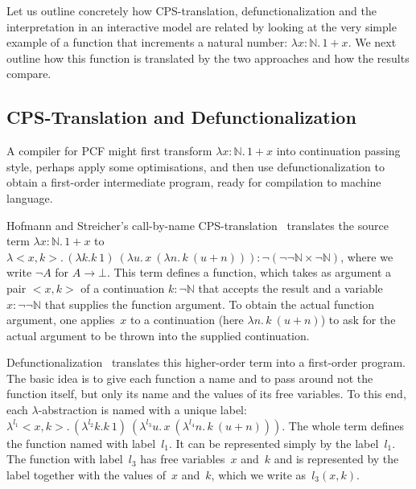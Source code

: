 \documentclass{LMCS}
\theoremstyle{definition}
\theoremstyle{plain}
\newcommand{\NN}{\mathbb{N}}
\newcommand{\tlami}[3]{\lambda {#1}{:}{#2}.\, {#3}}
\begin{document}
Let us outline concretely how CPS-translation, defunctionalization
and the interpretation in an interactive model are related
by looking at the very simple example of a function that increments a natural number:
$\tlami x \NN {1 + x}$.
We next outline how this function is translated by the two
approaches and how the results compare.

\subsection{CPS-Translation and Defunctionalization}

A compiler for PCF might first transform $\tlami x \NN {1 + x}$
into continuation passing style, perhaps apply some optimisations, and then use
defunctionalization to obtain a first-order intermediate program,
ready for compilation to machine language.

Hofmann and Streicher's call-by-name CPS-translation~\cite{DBLP:conf/lics/HofmannS97} 
translates the source term
$\tlami x \NN {1 + x}$ to 
$\lambda <x,k>.\, (\lambda k. k\ 1)\ (\lambda u.\, x\ (\lambda n.\, k\ (u+n)))
\colon \neg(\neg \neg \NN \times \neg \NN)$,
where we write $\neg A$ for $A\to \bot$.
This term defines a function, which takes as argument a pair $<x,k>$ of a continuation
$k\colon \neg \NN$ that accepts the result and
a variable $x\colon \neg\neg\NN$ that supplies the 
function argument. To obtain the actual function argument, one applies~$x$ to
a continuation (here $\lambda n.\, k\ (u+n)$) to 
ask for the actual argument to be thrown into the supplied 
continuation.

Defunctionalization~\cite{reynolds} translates this higher-order term into a
first-order program. The basic idea is to give each function a name 
and to pass around not the function itself, but only its name 
and the values of its free variables. 
To this end, each $\lambda$-abstraction is named with a unique label:
$\lambda^{l_1} <x,k>.\, (\lambda^{l_2} k. k\ 1)\ (\lambda^{l_3} u.\, x\ (\lambda^{l_4} n.\, k\ (u+n)))$.
The whole term defines the function named with label~$l_1$. 
It can be represented simply by the label~$l_1$. The 
function with label~$l_3$ has free variables~$x$ and~$k$ and 
is represented by the label 
together with the values of~$x$ and~$k$, which we write as~$l_3(x,k)$.
\end{document}
